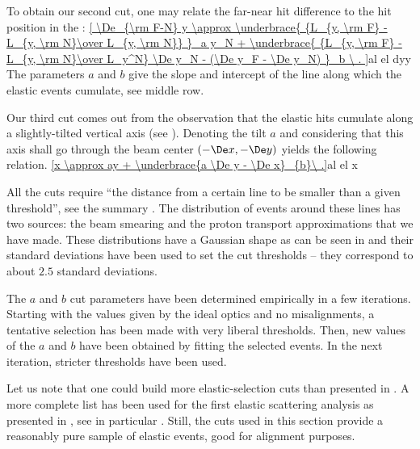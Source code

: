 To obtain our second cut, one may relate the far-near hit difference to the hit position in the :
\eqref{
	\De_{\rm F-N} y \approx
	\underbrace{ {L_{y, \rm F} - L_{y, \rm N}\over L_{y, \rm N}} }_a y_N 
	+ \underbrace{ {L_{y, \rm F} - L_{y, \rm N}\over L_y^N} \De y_N - (\De y_F - \De y_N) }_b \ .
}{al el dyy}
The parameters $a$ and $b$ give the slope and intercept of the line along which the elastic events cumulate, see  middle row.

Our third cut comes out from the observation that the elastic hits cumulate along a slightly-tilted vertical axis (see ). Denoting the tilt $a$ and considering that this axis shall go through the beam center $(-\De x, -\De y)$ yields the following relation.
\eqref{x \approx ay + \underbrace{a \De y - \De x}_{b}\ .}{al el x} 

All the cuts  require ``the distance from a certain line to be smaller than a given threshold'', see the summary . The distribution of events around these lines has two sources: the beam smearing and the proton transport approximations that we have made. These distributions have a Gaussian shape as can be seen in  and their standard deviations have been used to set the cut thresholds -- they correspond to about $2.5$ standard deviations.



The $a$ and $b$ cut parameters have been determined empirically in a few iterations. Starting with the values given by the ideal optics and no misalignments, a tentative selection has been made with very liberal thresholds. Then, new values of the $a$ and $b$ have been obtained by fitting the selected events. In the next iteration, stricter thresholds have been used.

Let us note that one could build more elastic-selection cuts than presented in . A more complete list has been used for the first elastic scattering analysis as presented in , see in particular . Still, the cuts used in this section provide a reasonably pure sample of elastic events, good for alignment purposes.

